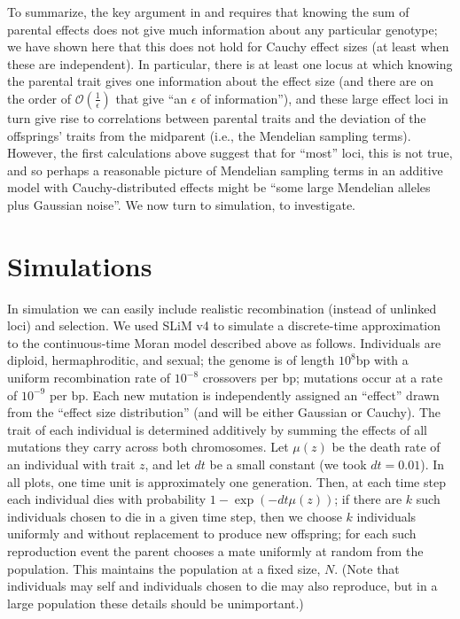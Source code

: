 \documentclass{article}
\newcommand{\1}{\mathbbm{1}}
\newcommand{\Oh}{{\mathcal O}}
\theoremstyle{remark}
\theoremstyle{definition}
\begin{document}
To summarize, the key argument in \citet{Fisher1918} and \cite{barton2017infinitesimal}  
requires that knowing the sum of parental effects does not give much information 
about any particular genotype;
we have shown here that this does not hold for Cauchy effect sizes
(at least when these are independent).
In particular, there is at least one locus at which knowing the parental trait gives one information about the effect size (and there are on the order of $\Oh\left(\frac{1}{\epsilon}\right)$ that give ``an $\epsilon$ of information''), and these large effect loci in turn give rise to correlations between
parental traits and the deviation of the offsprings' traits from the midparent
(i.e., the Mendelian sampling terms).
However, the first calculations above
suggest that for ``most'' loci,
this is not true,
and so perhaps a reasonable picture of Mendelian sampling terms
in an additive model with Cauchy-distributed effects
might be ``some large Mendelian alleles plus Gaussian noise''.
We now turn to simulation,
to investigate.

\section{Simulations}
    \label{sec:simulation}

In simulation we can easily include realistic recombination (instead of unlinked loci) and selection.
We used SLiM v4 \citep{haller2022slim4}
to simulate a discrete-time approximation to the continuous-time Moran model described above
as follows.
Individuals are diploid, hermaphroditic, and sexual;
the genome is of length $10^8$bp with a uniform recombination rate of $10^{-8}$ crossovers per bp;
mutations occur at a rate of $10^{-9}$ per bp. 
Each new mutation is independently assigned an ``effect''
drawn from the ``effect size distribution'' (and will be either Gaussian or Cauchy).
The trait of each individual is determined additively
by summing the effects of all mutations they carry across both chromosomes.
Let $\mu(z)$ be the death rate of an individual with trait $z$,
and let $dt$ be a small constant (we took $dt=0.01$).
In all plots, one time unit is approximately one generation.
Then, at each time step
each individual dies with probability $1 - \exp(-dt \mu(z))$;
if there are $k$ such individuals chosen to die in a given time step,
then we choose $k$ individuals uniformly and without replacement
to produce new offspring;
for each such reproduction event the parent chooses a mate uniformly at random from the population.
This maintains the population at a fixed size, $N$.
(Note that individuals may self and individuals chosen to die may also reproduce,
but in a large population these details should be unimportant.)
\end{document}

